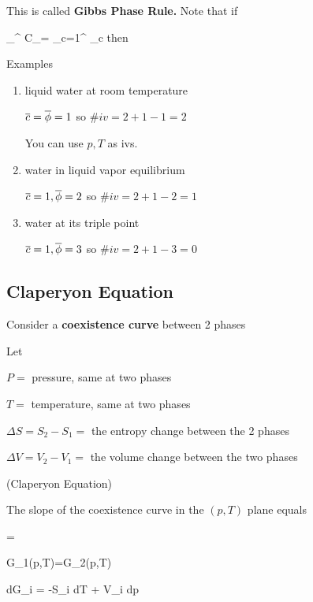 \beq
{}
\label{eq-gibbs-ph-rule}
\eeq
This is called {\bf Gibbs Phase Rule.}
Note that if 

\beq
\sum_{}^{\ol{\phi}} C_\phi=
\sum_{c=1}^{} \Phi_c
\eeq
then

\beq
{}
\eeq
Examples

\begin{enumerate}
\item
liquid water at room temperature

$\overline{c}=\overline{\phi}=1 $ so $\#iv =2+1-1=2$

You can use $p, T$ as ivs.

\item
water in liquid
vapor equilibrium

$\overline{c}=1, \overline{\phi}=2$ so $\#iv = 2+1-2=1$


\item
water at its triple point

$\overline{c}=1, \overline{\phi} =3$ so $\#iv = 2+1-3 =0$


\end{enumerate}


\subsection{Claperyon Equation}

Consider a 
{\bf coexistence curve}
between 2 phases

Let

$P=$ pressure, same at two phases

$T=$ temperature, same at two  phases

$\Delta S = S_2-S_1=$ the entropy change between the 2 phases

$\Delta V = V_2-V_1=$ the volume change between the two phases

\begin{claim}(Claperyon Equation)

The slope of the coexistence
curve in the $(p,T)$ plane equals

\beq
{}= 
\eeq
\end{claim}
\proof

\beq
G_1(p,T)=G_2(p,T)
\eeq

\beq
dG_i = -S_i dT + V_i dp
\eeq

